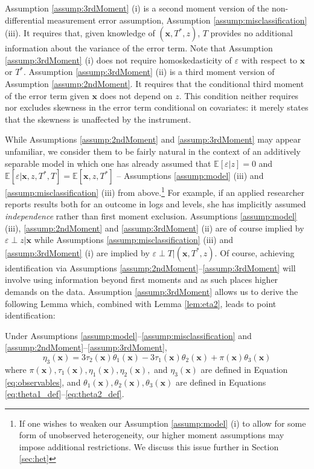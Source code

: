 Assumption \ref{assump:3rdMoment} (i) is a second moment version of the non-differential measurement error assumption, Assumption \ref{assump:misclassification} (iii).
It requires that, given knowledge of $(\mathbf{x}, T^*,z)$, $T$ provides no additional information about the variance of the error term.
Note that Assumption \ref{assump:3rdMoment} (i) does not require homoskedasticity of $\varepsilon$ with respect to $\mathbf{x}$ or $T^*$.
Assumption \ref{assump:3rdMoment} (ii) is a third moment version of Assumption \ref{assump:2ndMoment}.
It requires that the conditional third moment of the error term given $\mathbf{x}$ does not depend on $z$.
This condition neither requires nor excludes skewness in the error term conditional on covariates: it merely states that the skewness is unaffected by the instrument.

While Assumptions \ref{assump:2ndMoment} and \ref{assump:3rdMoment} may appear unfamiliar, we consider them to be fairly natural in the context of an additively separable model in which one has already assumed that $\mathbb{E}[\varepsilon|z]=0$ and $\mathbb{E}[\varepsilon|\mathbf{x},z,T^*,T] = \mathbb{E}[\mathbf{x},z,T^*]$ -- Assumptions \ref{assump:model} (iii) and \ref{assump:misclassification} (iii) from above.\footnote{If one wishes to weaken our Assumption \ref{assump:model} (i) to allow for some form of unobserved heterogeneity, our higher moment assumptions may impose additional restrictions. We discuss this issue further in Section \ref{sec:het}}
For example, if an applied researcher reports results both for an outcome in logs and levels, she has implicitly assumed \emph{independence} rather than first moment exclusion. 
Assumptions \ref{assump:model} (iii), \ref{assump:2ndMoment} and \ref{assump:3rdMoment} (ii) are of course implied by $\varepsilon \perp z |\mathbf{x}$ while Assumptions \ref{assump:misclassification} (iii) and \ref{assump:3rdMoment} (i) are implied by $\varepsilon\perp T | (\mathbf{x}, T^*, z)$.
Of course, achieving identification via Assumptions \ref{assump:2ndMoment}--\ref{assump:3rdMoment} will involve using information beyond first moments and as such places higher demands on the data.
Assumption \ref{assump:3rdMoment} allows us to derive the following Lemma which, combined with Lemma \ref{lem:eta2}, leads to point identification: 

\begin{lem}
  Under Assumptions \ref{assump:model}--\ref{assump:misclassification} and \ref{assump:2ndMoment}--\ref{assump:3rdMoment}, 
\[
  \eta_3(\mathbf{x}) =  3\tau_2(\mathbf{x}) \theta_1(\mathbf{x}) - 3\tau_1(\mathbf{x}) \theta_2(\mathbf{x}) + \pi(\mathbf{x})\theta_3(\mathbf{x})
\]
where $\pi(\mathbf{x}), \tau_1(\mathbf{x}), \eta_1(\mathbf{x}), \eta_2(\mathbf{x}),$ and $\eta_3(\mathbf{x})$ are defined in Equation \ref{eq:observables}, and $\theta_1(\mathbf{x}),\theta_2(\mathbf{x}),\theta_3(\mathbf{x})$ are defined in Equations \ref{eq:theta1_def}--\ref{eq:theta2_def}.
\label{lem:eta3}
\end{lem}

